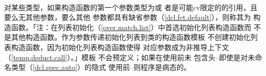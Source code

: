 \paragraph{}
对某些类型，如果构造函数的第一个参数类型为或
者是可能cv限定的的引用，且要么无其他参数，要么其他
参数都具有缺省参数（\ref{dcl.fct.default}），则称其为
构造函数。「注：在列表初始化（\ref{over.match.list}）中首选初始化列表构造函数而
不是其他构造函数。作为参数传递初始化列表到类的构造函数模板
不创建初始化列表构造函数，因为初始化列表构造函数使得
对应参数成为非推导上下文（\ref{temp.deduct.call}）。」模板
不会预定义；如果在使用前未
包含头--即使是对未命名类型（\ref{dcl.spec.auto}）的隐式
使用前--则程序是病态的。

